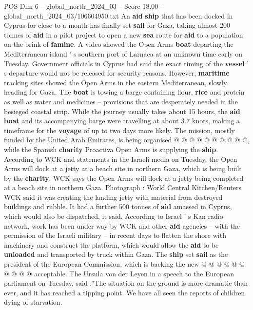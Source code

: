 \begin{textsample}{POS Dim 6 – global\_north\_2024\_03 – Score 18.00 – global\_north\_2024\_03/106604950.txt}  \label{ex:f6_pos_041}
An \textbf{aid} \textbf{ship} that has been docked in Cyprus for close to a month has finally set \textbf{sail} for Gaza, taking almost 200 tonnes of \textbf{aid} in a pilot project to open a new \textbf{sea} route for \textbf{aid} to a population on the brink of \textbf{famine}.
A video showed the Open Arms \textbf{boat} departing the Mediterranean island ' s southern port of Larnaca at an unknown time early on Tuesday.
Government officials in Cyprus had said the exact timing of the \textbf{vessel} ' s departure would not be released for security reasons.
However, \textbf{maritime} tracking sites showed the Open Arms in the eastern Mediterranean, slowly heading for Gaza.
The \textbf{boat} is towing a barge containing flour, \textbf{rice} and protein as well as water and medicines -- provisions that are desperately needed in the besieged coastal strip.
While the journey usually takes about 15 hours, the \textbf{aid} \textbf{boat} and its accompanying barge were travelling at about 3.7 knots, making a timeframe for the \textbf{voyage} of up to two days more likely.
The mission, mostly funded by the United Arab Emirates, is being organised @ @ @ @ @ @ @ @ @ @, while the Spanish \textbf{charity} Proactiva Open Arms is supplying the \textbf{ship}.
According to WCK and statements in the Israeli media on Tuesday, the Open Arms will dock at a jetty at a beach site in northern Gaza, which is being built by the \textbf{charity}.
WCK says the Open Arms will dock at a jetty being completed at a beach site in northern Gaza.
Photograph : World Central Kitchen/Reuters WCK said it was creating the landing jetty with material from destroyed buildings and rubble.
It had a further 500 tonnes of \textbf{aid} amassed in Cyprus, which would also be dispatched, it said.
According to Israel ' s Kan radio network, work has been under way by WCK and other \textbf{aid} agencies -- with the permission of the Israeli military -- in recent days to flatten the shore with machinery and construct the platform, which would allow the \textbf{aid} to be \textbf{unloaded} and transported by truck within Gaza.
The \textbf{ship} set \textbf{sail} as the president of the European Commission, which is backing the new @ @ @ @ @ @ @ @ @ @ acceptable.
The Ursula von der Leyen in a speech to the European parliament on Tuesday, said :"The situation on the ground is more dramatic than ever, and it has reached a tipping point.
We have all seen the reports of children dying of starvation.

\end{textsample}
